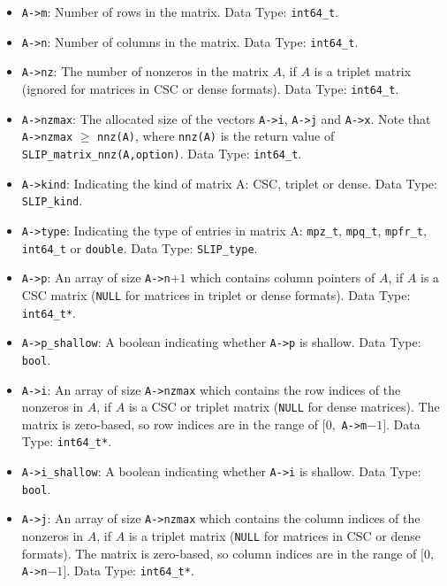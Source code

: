 \documentclass[12pt]{article}
\theoremstyle{definition}
\begin{document}
\begin{itemize}
\item \verb|A->m|: Number of rows in the matrix. Data Type: \verb|int64_t|.

\item \verb|A->n|: Number of columns in the matrix. Data Type: \verb|int64_t|.

\item \verb|A->nz|: The number of nonzeros in the matrix $A$, if $A$ is
a triplet matrix (ignored for matrices in CSC or dense formats). Data Type:
\verb|int64_t|.

\item \verb|A->nzmax|: The allocated size of the vectors \verb|A->i|,
\verb|A->j| and \verb|A->x|. Note that \verb|A->nzmax| $\geq$ \verb|nnz(A)|,
where \verb|nnz(A)| is the return value of \verb|SLIP_matrix_nnz(A,option)|.
Data Type: \verb|int64_t|.

\item \verb|A->kind|: Indicating the kind of matrix A: CSC, triplet or dense.
Data Type: \verb|SLIP_kind|.

\item \verb|A->type|: Indicating the type of entries in matrix A: \verb|mpz_t|,
\verb|mpq_t|, \verb|mpfr_t|, \verb|int64_t| or \verb|double|.
Data Type: \verb|SLIP_type|.

\item \verb|A->p|: An array of size \verb|A->n|$+1$ which contains column pointers
of $A$, if $A$ is a CSC matrix (\verb|NULL| for matrices in triplet or dense
formats). Data Type: \verb|int64_t*|.

\item \verb|A->p_shallow|: A boolean indicating whether \verb|A->p| is shallow.
Data Type: \verb|bool|.

\item \verb|A->i|: An array of size \verb|A->nzmax| which contains the row
indices of the nonzeros in $A$, if $A$ is a CSC or triplet matrix (\verb|NULL|
for dense matrices). The matrix is zero-based, so row indices are
in the range of $[0,$ \verb|A->m|$-1]$. Data Type: \verb|int64_t*|.

\item \verb|A->i_shallow|: A boolean indicating whether \verb|A->i| is shallow.
Data Type: \verb|bool|.

\item \verb|A->j|: An array of size \verb|A->nzmax| which contains the column
indices of the nonzeros in $A$, if $A$ is a triplet matrix (\verb|NULL| for
matrices in CSC or dense formats).
The matrix is zero-based, so column indices are
in the range of $[0,$ \verb|A->n|$-1]$. Data Type: \verb|int64_t*|.


\end{itemize}
\end{document}
